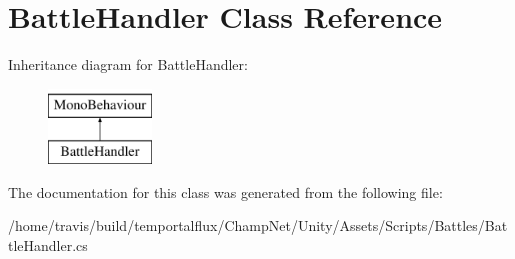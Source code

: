 \hypertarget{class_battle_handler}{\section{Battle\-Handler Class Reference}
\label{class_battle_handler}
}
Inheritance diagram for Battle\-Handler\-:\begin{figure}[H]
\begin{center}
\leavevmode
\includegraphics[height=2.000000cm]{class_battle_handler}
\end{center}
\end{figure}


The documentation for this class was generated from the following file\-:\begin{DoxyCompactItemize}
\item 
/home/travis/build/temportalflux/\-Champ\-Net/\-Unity/\-Assets/\-Scripts/\-Battles/Battle\-Handler.\-cs\end{DoxyCompactItemize}
